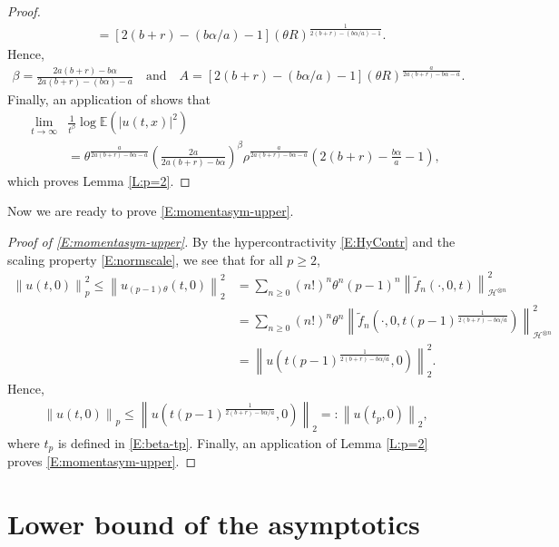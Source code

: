 \documentclass[12pt]{report}
\theoremstyle{plain}
\theoremstyle{definition}
\numberwithin{equation}{section}
\newcommand{\Norm}[1]{\left\|  #1   \right\|}
\begin{document}
\begin{proof}
\begin{align*}
	& = [2(b+r) - (b\alpha/a) -1](\theta R)^{\frac{1}{2(b+r)-(b\alpha/a)-1}}.
	\end{align*}
	Hence,
	\begin{align*}
	\beta = \frac{2a(b+r)-b\alpha}{2a(b+r)-(b\alpha)-a} \quad \text{and} \quad
	A   = [2(b+r) - (b\alpha/a) -1](\theta R)^{\frac{a}{2a(b+r)-b\alpha-a}}.
	\end{align*}
	Finally, an application of \cite[Lemma A.2]{balan.chen.ea:22:exact} shows that
	\begin{align*}
	\lim_{t\to \infty}
	& \frac{1}{t^\beta} \log \mathbb{E}(|u(t,x)|^2) \\
	& = \theta^{\frac{a}{2a(b+r)-b\alpha-a}}\left( \frac{2a}{2a(b+r)- b\alpha} \right)^\beta \rho^{\frac{a}{2a(b+r)-b\alpha-a}}\left(2(b+r)-\frac{b\alpha}{a}-1\right),
	\end{align*}
	which proves Lemma \ref{L:p=2}.
\end{proof}

Now we are ready to prove \eqref{E:momentasym-upper}.

\begin{proof}[Proof of \eqref{E:momentasym-upper}]
	By the hypercontractivity \eqref{E:HyContr} and the scaling property \eqref{E:normscale}, we see
	that for all $p \ge 2$,
	\begin{align*}
	\Norm{u(t,0)}_p^2  \le
	\Norm{u_{(p-1)\theta}(t,0)}_2^2
	& = \sum_{n \ge 0}(n!)^n\theta^n(p-1)^n \Norm{\widetilde{f}_n(\cdot,0,t)}_{\mathcal{H}^{\otimes n}}^2                                       \\
	& = \sum_{n \ge 0}(n!)^n\theta^n \Norm{\widetilde{f}_n\left(\cdot,0,t(p-1)^{\frac{1}{2(b+r)-b\alpha/a}}\right)}_{\mathcal{H}^{\otimes n}}^2 \\
	& = \Norm{u\left(t(p-1)^{\frac{1}{2(b+r)-b\alpha/a}}, 0\right)}_2^2.
	\end{align*}
	Hence,
	\begin{align} \label{E:pMom2}
	\Norm{u(t,0)}_p \le \Norm{u\left(t(p-1)^{\frac{1}{2(b+r)-b\alpha/a}}, 0\right)}_2 =: \Norm{u(t_p,0)}_2,
	\end{align}
	where $t_p$ is defined in \eqref{E:beta-tp}. Finally, an application of Lemma \ref{L:p=2} proves
	\eqref{E:momentasym-upper}.
\end{proof}

\section{Lower bound of the asymptotics} \label{S:lowerbd}
\end{document}
